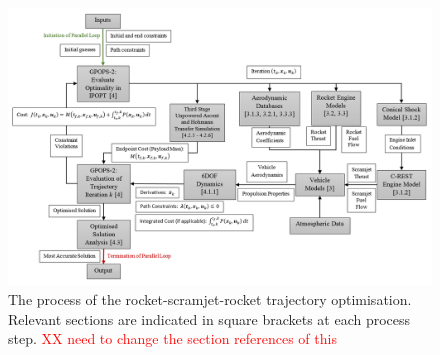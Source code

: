 \begin{landscape}%
	\begin{figure}[ht]
		\centering
		\includegraphics[width=0.98\linewidth]{"figures/4_LODESTAR/Ascent Flowchart"}
		\caption{The process of the rocket-scramjet-rocket trajectory optimisation. Relevant sections are indicated in square brackets at each process step. \textcolor{red}{XX need to change the section references of this}}
		\label{fig:AscentFlowchart}
	\end{figure} 
\end{landscape}